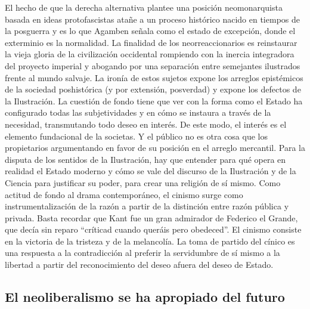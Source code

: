 \documentclass[
]{article}
\begin{document}
El hecho de que la derecha alternativa plantee una posición
neomonarquista basada en ideas protofascistas atañe a un proceso
histórico nacido en tiempos de la posguerra y es lo que Agamben señala
como el estado de excepción, donde el exterminio es la normalidad. La
finalidad de los neorreaccionarios es reinstaurar la vieja gloria de la
civilización occidental rompiendo con la inercia integradora del
proyecto imperial y abogando por una separación entre semejantes
ilustrados frente al mundo salvaje. La ironía de estos sujetos expone
los arreglos epistémicos de la sociedad poshistórica (y por extensión,
posverdad) y expone los defectos de la Ilustración. La cuestión de fondo
tiene que ver con la forma como el Estado ha configurado todas las
subjetividades y en cómo se instaura a través de la necesidad,
transmutando todo deseo en interés. De este modo, el interés es el
elemento fundacional de la societas. Y el público no es otra cosa que
los propietarios argumentando en favor de su posición en el arreglo
mercantil. Para la disputa de los sentidos de la Ilustración, hay que
entender para qué opera en realidad el Estado moderno y cómo se vale del
discurso de la Ilustración y de la Ciencia para justificar su poder,
para crear una religión de sí mismo. Como actitud de fondo al drama
contemporáneo, el cinismo surge como instrumentalización de la razón a
partir de la distinción entre razón pública y privada. Basta recordar
que Kant fue un gran admirador de Federico el Grande, que decía sin
reparo ``críticad cuando queráis pero obedeced''. El cinismo consiste en
la victoria de la tristeza y de la melancolía. La toma de partido del
cínico es una respuesta a la contradicción al preferir la servidumbre de
sí mismo a la libertad a partir del reconocimiento del deseo afuera del
deseo de Estado.

\hypertarget{el-neoliberalismo-se-ha-apropiado-del-futuro}{%
\subsection{El neoliberalismo se ha apropiado del
futuro}\label{el-neoliberalismo-se-ha-apropiado-del-futuro}}
\end{document}

